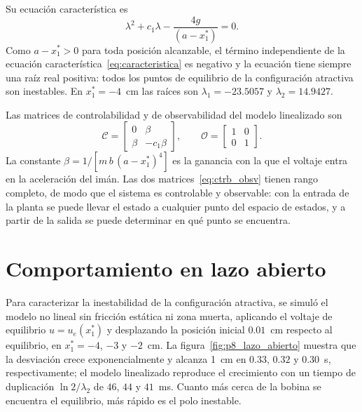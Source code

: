 Su ecuación característica es
\begin{equation}
\lambda^2 + c_1\lambda - \dfrac{4g}{(a-x_1^{\ast})} = 0 .
\label{eq:caracteristica}
\end{equation}
Como $a - x_1^{\ast} > 0$ para toda posición alcanzable, el término independiente de la ecuación característica~\eqref{eq:caracteristica} es negativo y la ecuación tiene siempre una raíz real positiva: todos los puntos de equilibrio de la configuración atractiva son inestables. En $x_1^{\ast}=-4$~cm las raíces son $\lambda_1 = -23.5057$ y $\lambda_2 = 14.9427$.

Las matrices de controlabilidad y de observabilidad del modelo linealizado son
\begin{equation}
\mathcal{C}
=
\begin{bmatrix}
0 & \beta\\[6pt]
\beta & -c_1 \beta
\end{bmatrix} ,
\qquad
\mathcal{O}
=
\begin{bmatrix}
1 & 0\\[6pt]
0 & 1
\end{bmatrix} .
\label{eq:ctrb_obsv}
\end{equation}
La constante $\beta = 1/[m\,b\,(a-x_1^{\ast})^4]$ es la ganancia con la que el voltaje entra en la aceleración del imán. Las dos matrices~\eqref{eq:ctrb_obsv} tienen rango completo, de modo que el sistema es controlable y observable: con la entrada de la planta se puede llevar el estado a cualquier punto del espacio de estados, y a partir de la salida se puede determinar en qué punto se encuentra.

\section{Comportamiento en lazo abierto}\label{sec:lazo_abierto}

Para caracterizar la inestabilidad de la configuración atractiva, se simuló el modelo no lineal sin fricción estática ni zona muerta, aplicando el voltaje de equilibrio $u=u_e(x_1^*)$ y desplazando la posición inicial $0.01$~cm respecto al equilibrio, en $x_1^*=-4$, $-3$ y $-2$~cm. La figura~\ref{fig:p8_lazo_abierto} muestra que la desviación crece exponencialmente y alcanza 1~cm en $0.33$, $0.32$ y $0.30$~s, respectivamente; el modelo linealizado reproduce el crecimiento con un tiempo de duplicación $\ln 2/\lambda_2$ de $46$, $44$ y $41$~ms. Cuanto más cerca de la bobina se encuentra el equilibrio, más rápido es el polo inestable.

